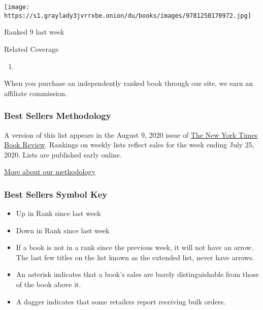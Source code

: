 \begin{enumerate}
  \texttt{[image: https://s1.graylady3jvrrxbe.onion/du/books/images/9781250170972.jpg]}

  Ranked 9 last week
\end{enumerate}

Related Coverage

\begin{enumerate}
\def\labelenumi{\arabic{enumi}.}
\tightlist
\item
  \href{https://www.nytimes3xbfgragh.onion/2020/07/31/books/review/the-system-robert-reich-break-em-up-zephyr-teachout.html}{}
\end{enumerate}

When you purchase an independently ranked book through our site, we earn
an affiliate commission.

\hypertarget{best-sellers-methodology}{%
\subsubsection{Best Sellers
Methodology}\label{best-sellers-methodology}}

A version of this list appears in the August 9, 2020 issue of
\href{http://www.nytimes3xbfgragh.onion/section/books/review}{The New
York Times Book Review}. Rankings on weekly lists reflect sales for the
week ending July 25, 2020. Lists are published early online.

\href{/books/best-sellers/methodology/}{More about our methodology}

\hypertarget{best-sellers-symbol-key}{%
\subsubsection{Best Sellers Symbol Key}\label{best-sellers-symbol-key}}

\begin{itemize}
\item
  Up in Rank since last week
\item
  Down in Rank since last week
\item
  If a book is not in a rank since the previous week, it will not have
  an arrow. The last few titles on the list known as the extended list,
  never have arrows.
\item
  An asterisk indicates that a book's sales are barely distinguishable
  from those of the book above it.
\item
  A dagger indicates that some retailers report receiving bulk orders.
\end{itemize}

